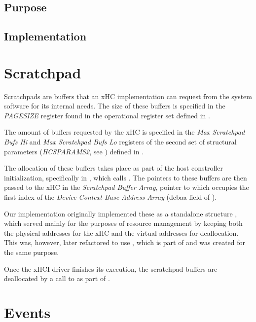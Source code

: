 \subsection{Purpose}
\subsection{Implementation}

\section{Scratchpad}

Scratchpads are buffers that an xHC implementation can request from the system software
for its internal needs. The size of these buffers is specified in the \textit{PAGESIZE} register
found in the operational register set defined in .

The amount of buffers requested by the xHC is specified in the \textit{Max Scratchpad Bufs Hi} and
\textit{Max Scratchpad Bufs Lo} registers of the second set of structural parameters (\textit{HCSPARAMS2},
see ) defined in .

The allocation of these buffers takes place as part of the host constroller initialization,
specifically in , which calls . The pointers
to these buffers are then passed to the xHC in the \textit{Scratchpad Buffer Array}, pointer to which
occupies the first index of the \textit{Device Context Base Address Array} (dcbaa field of
).

Our implementation originally implemented these as a standalone structure ,
which served mainly for the purposes of resource management by keeping both the physical addresses
for the xHC and the virtual addresses for deallocation. This was, however, later refactored to use
, which is part of  and was created for the same purpose.

Once the xHCI driver finishes its execution, the scratchpad buffers are deallocated by a call to
 as part of .


\section{Events}

